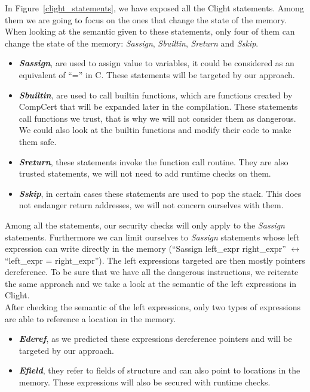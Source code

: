 \documentclass[11pt]{sdm}
\begin{document}
In Figure~\ref{clight_statements}, we have exposed all the Clight statements. Among them we are going to focus on the ones that change the state of the memory. When looking at the semantic given to these statements, only four of them can change the state of the memory: \textit{Sassign}, \textit{Sbuiltin}, \textit{Sreturn} and \textit{Sskip}.

\begin{itemize}
	\item \textbf{\textit{Sassign}}, are used to assign value to variables, it could be considered as an equivalent of ``='' in C. These statements will be targeted by our approach.
	\item \textbf{\textit{Sbuiltin}}, are used to call builtin functions, which are functions created by CompCert that will be expanded later in the compilation. These statements call functions we trust, that is why we will not consider them as dangerous. We could also look at the builtin functions and modify their code to make them safe.
	\item \textbf{\textit{Sreturn}}, these statements invoke the function call routine. They are also trusted statements, we will not need to add runtime checks on them.
	\item \textbf{\textit{Sskip}}, in certain cases these statements are used to pop the stack. This does not endanger return addresses, we will not concern ourselves with them.
\end{itemize}

Among all the statements, our security checks will only apply to the \textit{Sassign} statements.
Furthermore we can limit ourselves to \textit{Sassign} statements whose left expression can write directly in the memory (``Sassign left\_expr right\_expr'' $\leftrightarrow$ ``left\_expr = right\_expr''). The left expressions targeted are then mostly pointers dereference. To be sure that we have all the dangerous instructions, we reiterate the same approach and we take a look at the semantic of the left expressions in Clight.\\
After checking the semantic of the left expressions, only two types of expressions are able to reference a location in the memory.

\begin{itemize}
	\item \textbf{\textit{Ederef}}, as we predicted these expressions dereference pointers and will be targeted by our approach.
	\item \textbf{\textit{Efield}}, they refer to fields of structure and can also point to locations in the memory. These expressions will also be secured with runtime checks.
\end{itemize}
\end{document}

